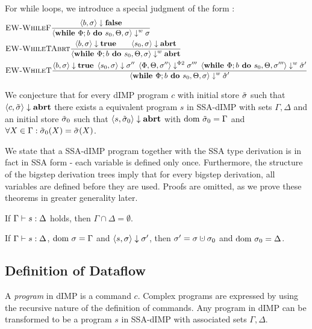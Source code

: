 For while loops, we introduce a special judgment of the form :
\begin{align*}
    &\textsc{EW-WhileF}\frac{\displaystyle \langle b, \sigma \rangle \downarrow \textbf{false}}{\displaystyle \langle \textbf{while }\Phi;{b} \textbf{ do } {s_0}, \Theta, \sigma \rangle \downarrow^w \sigma}\qquad\\
    &\textsc{EW-WhileTAbrt}\frac{\displaystyle \langle b, \sigma \rangle \downarrow \textbf{true} \qquad 
    \langle s_0, \sigma \rangle \downarrow \textbf{abrt}}{\displaystyle \langle \textbf{while }\Phi;{b} \textbf{ do } {s_0}, \Theta, \sigma \rangle \downarrow^w \textbf{abrt}}\\
    &\textsc{EW-WhileT}\frac{\displaystyle \langle b, \sigma \rangle \downarrow \textbf{true} \enskip
    \langle s_0, \sigma \rangle \downarrow \sigma'' \enskip
    \langle \Phi, \Theta, \sigma'' \rangle \downarrow^{\Phi2} \sigma''' \enskip
    \langle \textbf{while }\Phi;{b} \textbf{ do } {s_0}, \Theta, \sigma''' \rangle \downarrow^w \hat{\sigma}'}{\displaystyle \langle \textbf{while }\Phi;{b} \textbf{ do } {s_0}, \Theta, \sigma \rangle \downarrow^w \hat{\sigma}'}
\end{align*}
\begin{conjecture}
    We conjecture that for every dIMP program $c$ with initial store $\tilde{\sigma}$
    such that $\langle c, \tilde{\sigma} \rangle \downarrow \textbf{abrt}$ there exists a equivalent program
    $s$ in SSA-dIMP with sets $\Gamma, \Delta$ and an initial store $\tilde{\sigma}_0$ such that
     $\langle s, \tilde{\sigma}_0 \rangle \downarrow \textbf{abrt}$ with
    $\text{dom }{\tilde{\sigma}_0} = \Gamma$ and $\forall X \in \Gamma: \tilde{\sigma}_0(X) = \tilde{\sigma}(X)$.
\end{conjecture}

We state that a SSA-dIMP program together with the SSA type derivation
is in fact in SSA form - each variable is defined only once.
Furthermore, the structure of the bigstep derivation trees imply that 
for every bigstep derivation, all variables are defined before they are used.
Proofs are omitted, as we prove these theorems in greater generality later.

\begin{theorem}
    \label{thm:gamma-delta-disjoint}
    If $\Gamma \vdash {s}: \Delta$ holds, then $\Gamma \cap \Delta = \emptyset$.
\end{theorem}

\begin{theorem}
    If $\Gamma \vdash {s}: \Delta$, $\text{dom } \sigma = \Gamma$ and
    $\langle s, \sigma \rangle \downarrow \sigma'$, then $\store' = \store \dunion \store_0$
    and $\text{dom }{\sigma_0} = \Delta$.
\end{theorem}

\subsection{Definition of Dataflow}
\begin{definition}[Program]
    A \emph{program} in dIMP is a command $c$.
    Complex programs are expressed by using the recursive nature of
    the definition of commands.
    Any program in dIMP can be transformed to be a program $s$ in SSA-dIMP with associated
    sets $\Gamma, \Delta$.
\end{definition}

